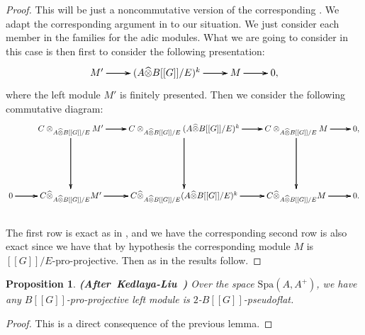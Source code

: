 \documentclass[12pt]{amsart}
\newtheorem{proposition}[theorem]{Proposition}
\theoremstyle{definition}
\numberwithin{equation}{section}
\begin{document}
\begin{proof}
This will be just a noncommutative version of the corresponding  \cite[Lemma 2.4.7]{KL2}. We adapt the corresponding argument in \cite[Lemma 2.4.7]{KL2} to our situation. We just consider each member in the families for the adic modules. What we are going to consider in this case is then first to consider the following presentation:
\[
\xymatrix@C+0pc@R+0pc{
M'  \ar[r]\ar[r]\ar[r] &(A\widehat{\otimes}B[[G]]/E)^k \ar[r]\ar[r]\ar[r] & M\ar[r]\ar[r]\ar[r] &0,
}
\]
where the left module $M'$ is finitely presented. Then we consider the following commutative diagram:
\[
\xymatrix@C+0pc@R+3pc{
&C\otimes_{A\widehat{\otimes}B[[G]]/E}M'  \ar[r]\ar[r]\ar[r]  \ar[d]\ar[d]\ar[d] &C\otimes_{A\widehat{\otimes}B[[G]]/E}(A\widehat{\otimes}B[[G]]/E)^k \ar[r]\ar[r]\ar[r] \ar[d]\ar[d]\ar[d] & C\otimes_{A\widehat{\otimes}B[[G]]/E}M\ar[r]\ar[r]\ar[r] \ar[d]\ar[d]\ar[d] &0,\\
0 \ar[r]\ar[r]\ar[r] &C\widehat{\otimes}_{A\widehat{\otimes}B[[G]]/E}M'  \ar[r]\ar[r]\ar[r] &C\widehat{\otimes}_{A\widehat{\otimes}B[[G]]/E}(A\widehat{\otimes}B[[G]]/E)^k \ar[r]\ar[r]\ar[r] & C\widehat{\otimes}_{A\widehat{\otimes}B[[G]]/E}M\ar[r]\ar[r]\ar[r] &0.
}
\]\\
The first row is exact as in \cite[Lemma 2.4.7]{KL2}, and we have the corresponding second row is also exact since we have that by hypothesis the corresponding module $M$ is $[[G]]/E$-pro-projective.  
Then as in \cite[Lemma 2.4.7]{KL2} the results follow.	
\end{proof}
















\begin{proposition} \mbox{\bf{(After Kedlaya-Liu \cite[Corollary 2.4.8]{KL2})}}
Over the space $\mathrm{Spa}(A,A^+)$, we have any $B[[G]]$-pro-projective left module is $2$-$B[[G]]$-pseudoflat.
\end{proposition}

\begin{proof}
This is a direct consequence of the previous lemma.	
\end{proof}
\end{document}
